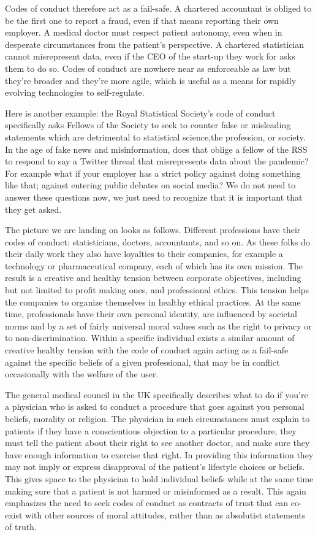 \documentclass[
]{book}
\theoremstyle{definition}
\theoremstyle{definition}
\theoremstyle{definition}
\theoremstyle{definition}
\theoremstyle{remark}
\begin{document}
Codes of conduct therefore act as a fail-safe. A chartered accountant is obliged to be the first one to report a fraud, even if that means reporting their own employer. A medical doctor must respect patient autonomy, even when in desperate circumstances from the patient's perspective. A chartered statistician cannot misrepresent data, even if the CEO of the start-up they work for asks them to do so. Codes of conduct are nowhere near as enforceable as law but they're broader and they're more agile, which is useful as a means for rapidly evolving technologies to self-regulate.

Here is another example: the Royal Statistical Society's code of conduct specifically asks Fellows of the Society to seek to counter false or misleading statements which are detrimental to statistical science,the profession, or society. In the age of fake news and misinformation, does that oblige a fellow of the RSS to respond to say a Twitter thread that misrepresents data about the pandemic? For example what if your employer has a strict policy against doing something like that; against entering public debates on social media? We do not need to answer these questions now, we just need to recognize that it is important that they get asked.

The picture we are landing on looks as follows. Different professions have their codes of conduct: statisticians, doctors, accountants, and so on. As these folks do their daily work they also have loyalties to their companies, for example a technology or pharmaceutical company, each of which has its own mission. The result is a creative and healthy tension between corporate objectives, including but not limited to profit making ones, and professional ethics. This tension helps the companies to organize themselves in healthy ethical practices. At the same time, professionals have their own personal identity, are influenced by societal norms and by a set of fairly universal moral values such as the right to privacy or to non-discrimination. Within a specific individual exists a similar amount of creative healthy tension with the code of conduct again acting as a fail-safe against the specific beliefs of a given professional, that may be in conflict occasionally with the welfare of the user.

The general medical council in the UK specifically describes what to do if you're a physician who is asked to conduct a procedure that goes against you personal beliefs, morality or religion. The physician in such circumstances must explain to patients if they have a conscientious objection to a particular procedure, they must tell the patient about their right to see another doctor, and make sure they have enough information to exercise that right. In providing this information they may not imply or express disapproval of the patient's lifestyle choices or beliefs. This gives space to the physician to hold individual beliefs while at the same time making sure that a patient is not harmed or misinformed as a result. This again emphasizes the need to seek codes of conduct as contracts of trust that can co-exist with other sources of moral attitudes, rather than as absolutist statements of truth.
\end{document}
